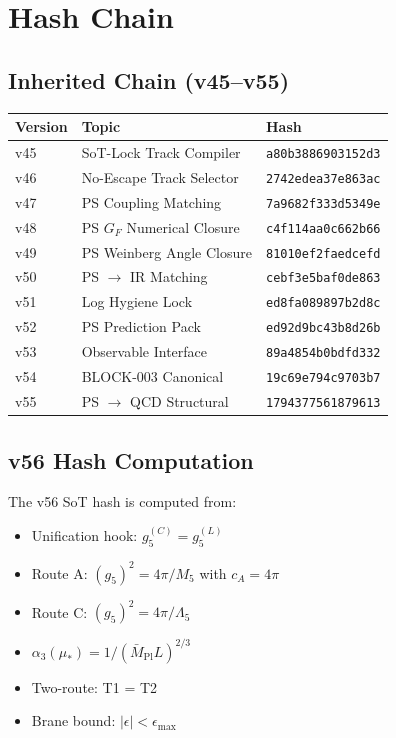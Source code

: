 \documentclass[11pt,a4paper]{article}
\theoremstyle{definition}
\begin{document}
\section{Hash Chain}
\label{sec:hash-chain}

\subsection{Inherited Chain (v45--v55)}
\label{subsec:inherited-chain}

\begin{hashbox}
\begin{tabular}{lll}
\toprule
Version & Topic & Hash \\
\midrule
v45 & SoT-Lock Track Compiler & \texttt{a80b3886903152d3} \\
v46 & No-Escape Track Selector & \texttt{2742edea37e863ac} \\
v47 & PS Coupling Matching & \texttt{7a9682f333d5349e} \\
v48 & PS $G_F$ Numerical Closure & \texttt{c4f114aa0c662b66} \\
v49 & PS Weinberg Angle Closure & \texttt{81010ef2faedcefd} \\
v50 & PS $\to$ IR Matching & \texttt{cebf3e5baf0de863} \\
v51 & Log Hygiene Lock & \texttt{ed8fa089897b2d8c} \\
v52 & PS Prediction Pack & \texttt{ed92d9bc43b8d26b} \\
v53 & Observable Interface & \texttt{89a4854b0bdfd332} \\
v54 & BLOCK-003 Canonical & \texttt{19c69e794c9703b7} \\
v55 & PS $\to$ QCD Structural & \texttt{1794377561879613} \\
\bottomrule
\end{tabular}
\end{hashbox}

\subsection{v56 Hash Computation}
\label{subsec:v56-hash}

The v56 SoT hash is computed from:
\begin{itemize}
  \item Unification hook: $g_5^{(C)} = g_5^{(L)}$
  \item Route A: $(g_5)^2 = 4\pi/M_5$ with $c_A = 4\pi$
  \item Route C: $(g_5)^2 = 4\pi/\Lambda_5$
  \item $\alpha_3(\mu_*) = 1/(\bar{M}_{\text{Pl}} L)^{2/3}$
  \item Two-route: T1 = T2
  \item Brane bound: $|\epsilon| < \epsilon_{\max}$
\end{itemize}
\end{document}
